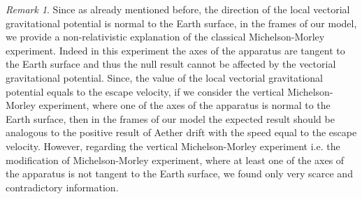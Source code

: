 \documentclass{article}
\theoremstyle{definition}
\theoremstyle{remark}
\newtheorem{remark}{Remark}[section]
\newtheorem{remark}{Remark}
\begin{document}
\begin{remark}\label{gyugfjyhgghg}
Since as already mentioned before, the direction of the local
vectorial gravitational potential is normal to the Earth surface, in
the frames of our model, we provide a non-relativistic explanation
of the classical Michelson-Morley experiment. Indeed in this
experiment the axes of the apparatus are tangent to the Earth
surface and thus the null result cannot be affected by the vectorial
gravitational potential. Since, the value of the local vectorial
gravitational potential equals to the escape velocity, if we
consider the vertical Michelson-Morley experiment, where one of the
axes of the apparatus is normal to the Earth surface, then in the
frames of our model the expected result should be analogous to the
positive result of Aether drift with the speed equal to the escape
velocity. However, regarding the vertical Michelson-Morley
experiment i.e. the modification of Michelson-Morley experiment,
where at least one of the axes of the apparatus is not tangent to
the Earth surface, we found only very scarce and contradictory
information.
\end{remark}
\end{document}
